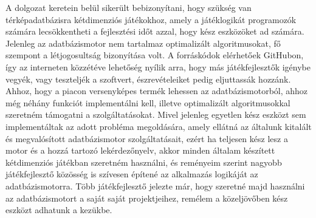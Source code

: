 
A dolgozat keretein belül sikerült bebizonyítani, hogy szükség van térképadatbázisra kétdimenziós játékokhoz, amely a játéklogikát programozók számára lecsökkentheti a fejlesztési időt azzal, hogy kész eszközöket ad számára. Jelenleg az adatbázismotor nem tartalmaz optimalizált algoritmusokat, fő szempont a létjogosultság bizonyítása volt. A forráskódok elérhetőek GitHubon, így az interneten közzétéve lehetőség nyílik arra, hogy más játékfejlesztők igénybe vegyék, vagy teszteljék a szoftvert, észrevételeiket pedig eljuttassák hozzánk. Ahhoz, hogy a piacon versenyképes termék lehessen az adatbázismotorból, ahhoz még néhány funkciót implementálni kell, illetve optimalizált algoritmusokkal szeretném támogatni a szolgáltatásokat. Mivel jelenleg egyetlen kész eszközt sem implementáltak az adott probléma megoldására, amely ellátná az általunk kitalált és megvalósított adatbázismotor szolgáltatásait, ezért ha teljesen kész lesz a motor és a hozzá tartozó lekérdezőnyelv, akkor minden általam készített kétdimenziós játékban szeretném használni, és reményeim szerint nagyobb játékfejlesztő közösség is szívesen építené az alkalmazás logikáját az adatbázismotorra.
Több játékfejlesztő jelezte már, hogy szeretné majd használni az adatbázismotort a saját saját projektjeihez, remélem a közeljövőben kész eszközt adhatunk a kezükbe.
